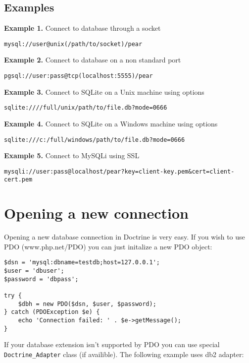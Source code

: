 \documentclass[11pt,a4paper]{report}
\begin{document}
\subsection{Examples}
\textbf{Example 1.} Connect to database through a socket

\begin{verbatim}
mysql://user@unix(/path/to/socket)/pear
\end{verbatim}

\textbf{Example 2.} Connect to database on a non standard port

\begin{verbatim}
pgsql://user:pass@tcp(localhost:5555)/pear
\end{verbatim}

\textbf{Example 3.} Connect to SQLite on a Unix machine using options

\begin{verbatim}
sqlite:////full/unix/path/to/file.db?mode=0666
\end{verbatim}

\textbf{Example 4.} Connect to SQLite on a Windows machine using options

\begin{verbatim}
sqlite:///c:/full/windows/path/to/file.db?mode=0666
\end{verbatim}

\textbf{Example 5.} Connect to MySQLi using SSL

\begin{verbatim}
mysqli://user:pass@localhost/pear?key=client-key.pem&cert=client-cert.pem
\end{verbatim}

\section{Opening a new connection}
Opening a new database connection in Doctrine is very easy. If you wish to use PDO (www.php.net/PDO) you can just initalize a new PDO object:

\begin{verbatim}
$dsn = 'mysql:dbname=testdb;host=127.0.0.1';
$user = 'dbuser';
$password = 'dbpass';

try {
    $dbh = new PDO($dsn, $user, $password);
} catch (PDOException $e) {
    echo 'Connection failed: ' . $e->getMessage();
}
\end{verbatim}

If your database extension isn't supported by PDO you can use special \texttt{Doctrine\_Adapter} class (if availible). The following example uses db2 adapter:
\end{document}
